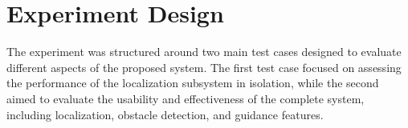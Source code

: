 \section{Experiment Design}

The experiment was structured around two main test cases designed to evaluate different aspects of the proposed system. The first test case focused on assessing the performance of the localization subsystem in isolation, while the second aimed to evaluate the usability and effectiveness of the complete system, including localization, obstacle detection, and guidance features.
